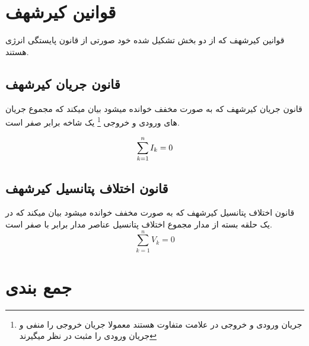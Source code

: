 \section{قوانین کیرشهف}
قوانین کیرشهف که از دو بخش تشکیل شده خود صورتی از قانون پایستگی انرژی هستند.
\subsection{قانون جریان کیرشهف}
قانون جریان کیرشهف که به صورت مخفف
خوانده میشود بیان میکند که مجموع جریان های ورودی و خروجی
\footnote{	جریان ورودی و خروجی در علامت متفاوت هستند معمولا جریان خروجی را منفی و جریان ورودی را مثبت در نظر میگیرند	}
 یک شاخه برابر صفر است.
 
\begin{equation}\label{eq:kcl}
	\sum_{k=1}^{n}I_k\index{k} = 0
\end{equation}
\subsection{قانون اختلاف پتانسیل کیرشهف}
قانون اختلاف پتانسیل کیرشهف که به صورت مخفف
خوانده میشود بیان میکند که در یک حلقه بسته از مدار مجموع اختلاف پتانسیل عناصر مدار برابر با صفر است.
\begin{equation}\label{eq:kvl}
	\sum_{k=1}^{n}V_k = 0
\end{equation}

\section{جمع بندی}